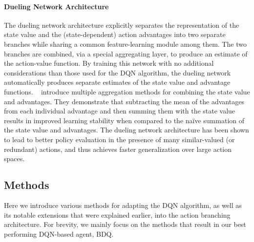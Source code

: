 \documentclass[letterpaper]{article}
\newcommand{\citet}[1]
{\citeauthor{#1}~\shortcite{#1}}
\newcommand{\citep}{\cite}
\begin{document}
\paragraph{Dueling Network Architecture} The dueling network architecture \citep{Wang:2016} explicitly separates the representation of the state value and the (state-dependent) action advantages into two separate branches while sharing a common feature-learning module among them. The two branches are combined, via a special aggregating layer, to produce an estimate of the action-value function. By training this network with no additional considerations than those used for the DQN algorithm, the dueling network automatically produces separate estimates of the state value and advantage functions. \citet{Wang:2016} introduce multiple aggregation methods for combining the state value and advantages. They demonstrate that subtracting the mean of the advantages from each individual advantage and then summing them with the state value results in improved learning stability when compared to the na{\"i}ve summation of the state value and advantages. The dueling network architecture has been shown to lead to better policy evaluation in the presence of many similar-valued (or redundant) actions, and thus achieves faster generalization over large action spaces.


\subsection{Methods}
\label{subsec:bdq_methods}

Here we introduce various methods for adapting the DQN algorithm, as well as its notable extensions that were explained earlier, into the action branching architecture. For brevity, we mainly focus on the methods that result in our best performing DQN-based agent, BDQ.
\end{document}
